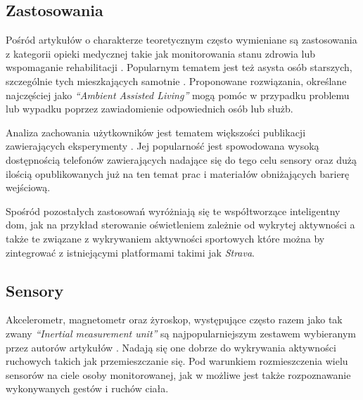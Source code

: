 \subsection{Zastosowania}
Pośród artykułów o charakterze teoretycznym często wymieniane są zastosowania z kategorii opieki medycznej takie jak monitorowania stanu zdrowia \cite{22_HAR_Survey_Ultrasonic} lub wspomaganie rehabilitacji \cite{35_HAR_Wearable_Review}. Popularnym tematem jest też asysta osób starszych, szczególnie tych mieszkających samotnie \cite{21_HAR_Smartphone}. Proponowane rozwiązania, określane najczęściej jako \textit{``Ambient Assisted Living''} mogą pomóc w przypadku problemu lub wypadku poprzez zawiadomienie odpowiednich osób lub służb.

Analiza zachowania użytkowników jest tematem większości publikacji zawierających eksperymenty \cite{2_Real_Time_HAR, 59_Air_Pressure_HAR, 33_Inertial_Study}. Jej popularność jest spowodowana wysoką dostępnością telefonów zawierających nadające się do tego celu sensory oraz dużą ilością opublikowanych już na ten temat prac i materiałów obniżających barierę wejściową.

Spośród pozostałych zastosowań wyróżniają się te współtworzące inteligentny dom, jak na przykład sterowanie oświetleniem zależnie od wykrytej aktywności \cite{36_Smart_Home_HAR} a także te związane z wykrywaniem aktywności sportowych \cite{29_Daily_Sport_HAR} które można by zintegrować z istniejącymi platformami takimi jak \textit{Strava}.


\subsection{Sensory}
Akcelerometr, magnetometr oraz żyroskop, występujące często razem jako tak zwany \textit{``Inertial measurement unit''} są najpopularniejszym zestawem wybieranym przez autorów artykułów \cite{30_Context_Awareness, 32_Accel_Phone_HAR}. Nadają się one dobrze do wykrywania aktywności ruchowych takich jak przemieszczanie się. Pod warunkiem rozmieszczenia wielu sensorów na ciele osoby monitorowanej, jak w \cite{29_Daily_Sport_HAR} możliwe jest także rozpoznawanie wykonywanych gestów i ruchów ciała.

